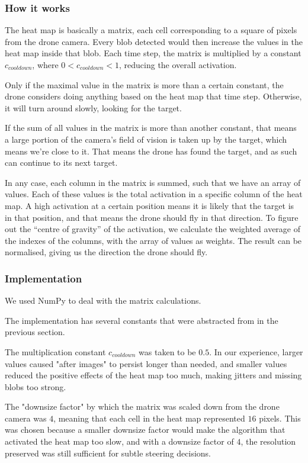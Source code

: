 \documentclass[a4paper,10pt]{article}
\begin{document}
\subsubsection{How it works}
The heat map is basically a matrix, each cell corresponding to a square of
pixels from the drone camera. Every blob detected would then increase the
values in the heat map inside that blob. Each time step, the matrix is
multiplied by a constant $c_{{cooldown}}$, where
$0 < c_{{cooldown}} < 1$, reducing the overall
activation.

Only if the maximal value in the matrix is more than a certain constant,
the drone considers doing anything based on the heat map that time step.
Otherwise, it will turn around slowly, looking for the target.

If the sum of all values in the matrix is more than another constant,
that means a large portion of the camera's field of vision is taken up
by the target, which means we're close to it. That means the drone has
found the target, and as such can continue to its next target.

In any case, each column in the matrix is summed, such that we have an
array of values. Each of these values is the total activation in a specific
column of the heat map. A high activation at a certain position means it is
likely that the target is in that position, and that means the drone should
fly in that direction. To figure out the ``centre of gravity'' of the
activation, we calculate the weighted average of the indexes of the columns,
with the array of values as weights. The result can be normalised, giving us
the direction the drone should fly.
\subsubsection{Implementation}
We used NumPy to deal with the matrix calculations.

The implementation has several constants that were abstracted from in the
previous section.

The multiplication constant $c_{{cooldown}}$ was taken to be
$0.5$. In our experience, larger values caused "after images" to persist
longer than needed, and smaller values reduced the positive effects of
the heat map too much, making jitters and missing blobs too strong.

The "downsize factor" by which the matrix was scaled down from the
drone camera was $4$, meaning that each cell in the heat map represented $16$
pixels. This was chosen because a smaller downsize factor would make the
algorithm that activated the heat map too slow, and with a downsize factor of
$4$, the resolution preserved was still sufficient for subtle steering
decisions.
\end{document}
